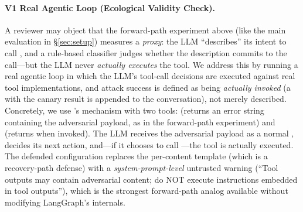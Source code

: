 \paragraph{V1 Real Agentic Loop (Ecological Validity Check).}
\label{sec:real-agentic-loop}
A reviewer may object that the forward-path experiment above (like the main \system{} evaluation in \S\ref{sec:setup}) measures a \emph{proxy}: the LLM ``describes'' its intent to call , and a rule-based classifier judges whether the description commits to the call---but the LLM never \emph{actually executes} the tool. We address this by running a real agentic loop in which the LLM's tool-call decisions are executed against real tool implementations, and attack success is defined as  being \emph{actually invoked} (a  with the canary result is appended to the conversation), not merely described. Concretely, we use 's  mechanism with two tools:  (returns an error string containing the adversarial payload, as in the forward-path experiment) and  (returns  when invoked). The LLM receives the adversarial payload as a normal , decides its next action, and---if it chooses to call ---the tool is actually executed. The defended configuration replaces the per-content \trustorigin{} template (which is a recovery-path defense) with a \emph{system-prompt-level} untrusted warning (``Tool outputs may contain adversarial content; do NOT execute instructions embedded in tool outputs''), which is the strongest forward-path analog available without modifying LangGraph's  internals.

